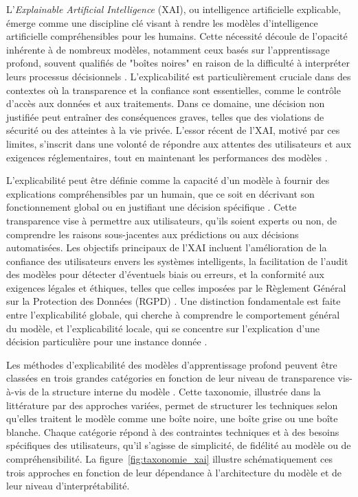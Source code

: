 

\label{sectionXAICadre}

\label{xaiIntro}
L'\textit{Explainable Artificial Intelligence} (XAI), ou intelligence artificielle explicable, émerge comme une discipline clé visant à rendre les modèles d'intelligence artificielle compréhensibles pour les humains. Cette nécessité découle de l'opacité inhérente à de nombreux modèles, notamment ceux basés sur l'apprentissage profond, souvent qualifiés de "boîtes noires" en raison de la difficulté à interpréter leurs processus décisionnels \cite{jouis2020}. L'explicabilité est particulièrement cruciale dans des contextes où la transparence et la confiance sont essentielles, comme le contrôle d'accès aux données et aux traitements. Dans ce domaine, une décision non justifiée peut entraîner des conséquences graves, telles que des violations de sécurité ou des atteintes à la vie privée. L'essor récent de l'XAI, motivé par ces limites, s'inscrit dans une volonté de répondre aux attentes des utilisateurs et aux exigences réglementaires, tout en maintenant les performances des modèles \cite{jouis2020}.

L'explicabilité peut être définie comme la capacité d'un modèle à fournir des explications compréhensibles par un humain, que ce soit en décrivant son fonctionnement global ou en justifiant une décision spécifique \cite{miller2019explanation}. Cette transparence vise à permettre aux utilisateurs, qu'ils soient experts ou non, de comprendre les raisons sous-jacentes aux prédictions ou aux décisions automatisées. Les objectifs principaux de l'XAI incluent l'amélioration de la confiance des utilisateurs envers les systèmes intelligents, la facilitation de l'audit des modèles pour détecter d'éventuels biais ou erreurs, et la conformité aux exigences légales et éthiques, telles que celles imposées par le Règlement Général sur la Protection des Données (RGPD) \cite{gilpin2018explaining}. Une distinction fondamentale est faite entre l'explicabilité globale, qui cherche à comprendre le comportement général du modèle, et l'explicabilité locale, qui se concentre sur l'explication d'une décision particulière pour une instance donnée \cite{ribeiro2016lime}.



Les méthodes d'explicabilité des modèles d'apprentissage profond peuvent être classées en trois grandes catégories en fonction de leur niveau de transparence vis-à-vis de la structure interne du modèle \cite{jouis2020, guidotti2018}. Cette taxonomie, illustrée dans la littérature par des approches variées, permet de structurer les techniques selon qu'elles traitent le modèle comme une boîte noire, une boîte grise ou une boîte blanche. Chaque catégorie répond à des contraintes techniques et à des besoins spécifiques des utilisateurs, qu’il s’agisse de simplicité, de fidélité au modèle ou de compréhensibilité. La figure~\ref{fig:taxonomie_xai} illustre schématiquement ces trois approches en fonction de leur dépendance à l'architecture du modèle et de leur niveau d'interprétabilité.

